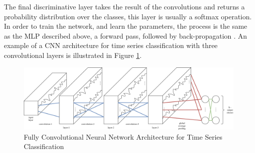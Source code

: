 \documentclass[journal]{IEEEtran}
\begin{document}
The final discriminative layer takes the result of the convolutions and returns a probability distribution over the classes, this layer is usually a softmax operation. In order to train the network, and learn the parameters, the process is the same as the MLP described above, a forward pass, followed by back-propagation \cite{lecun1998b}. An example of a CNN architecture for time series classification with three convolutional layers is illustrated in Figure \ref{fig:cnn-layers}.

\begin{figure}[!t]
    \centering
    \includegraphics[width=\textwidth]{assets/CNN_basic_3_layers.png}
    
    \caption{Fully Convolutional Neural Network Architecture for Time Series Classification}
    \label{fig:cnn-layers}
\end{figure}
\end{document}
